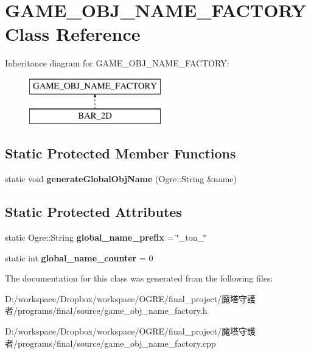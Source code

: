 \hypertarget{class_g_a_m_e___o_b_j___n_a_m_e___f_a_c_t_o_r_y}{
\section{GAME\_\-OBJ\_\-NAME\_\-FACTORY Class Reference}
\label{class_g_a_m_e___o_b_j___n_a_m_e___f_a_c_t_o_r_y}
}
Inheritance diagram for GAME\_\-OBJ\_\-NAME\_\-FACTORY:\begin{figure}[H]
\begin{center}
\leavevmode
\includegraphics[height=2.000000cm]{class_g_a_m_e___o_b_j___n_a_m_e___f_a_c_t_o_r_y}
\end{center}
\end{figure}
\subsection*{Static Protected Member Functions}
\begin{DoxyCompactItemize}
\item 
\hypertarget{class_g_a_m_e___o_b_j___n_a_m_e___f_a_c_t_o_r_y_a87c1cf8b74e7e3092dd1057074ac91f1}{
static void {\bfseries generateGlobalObjName} (Ogre::String \&name)}
\label{class_g_a_m_e___o_b_j___n_a_m_e___f_a_c_t_o_r_y_a87c1cf8b74e7e3092dd1057074ac91f1}

\end{DoxyCompactItemize}
\subsection*{Static Protected Attributes}
\begin{DoxyCompactItemize}
\item 
\hypertarget{class_g_a_m_e___o_b_j___n_a_m_e___f_a_c_t_o_r_y_a6d71ed26c2d1fa56915403036086a182}{
static Ogre::String {\bfseries global\_\-name\_\-prefix} = \char`\"{}\_\-ton\_\-\char`\"{}}
\label{class_g_a_m_e___o_b_j___n_a_m_e___f_a_c_t_o_r_y_a6d71ed26c2d1fa56915403036086a182}

\item 
\hypertarget{class_g_a_m_e___o_b_j___n_a_m_e___f_a_c_t_o_r_y_a97ac21f1ce006854463b9c9a839fe0b9}{
static int {\bfseries global\_\-name\_\-counter} = 0}
\label{class_g_a_m_e___o_b_j___n_a_m_e___f_a_c_t_o_r_y_a97ac21f1ce006854463b9c9a839fe0b9}

\end{DoxyCompactItemize}


The documentation for this class was generated from the following files:\begin{DoxyCompactItemize}
\item 
D:/workspace/Dropbox/workspace/OGRE/final\_\-project/魔塔守護者/programs/final/source/game\_\-obj\_\-name\_\-factory.h\item 
D:/workspace/Dropbox/workspace/OGRE/final\_\-project/魔塔守護者/programs/final/source/game\_\-obj\_\-name\_\-factory.cpp\end{DoxyCompactItemize}
